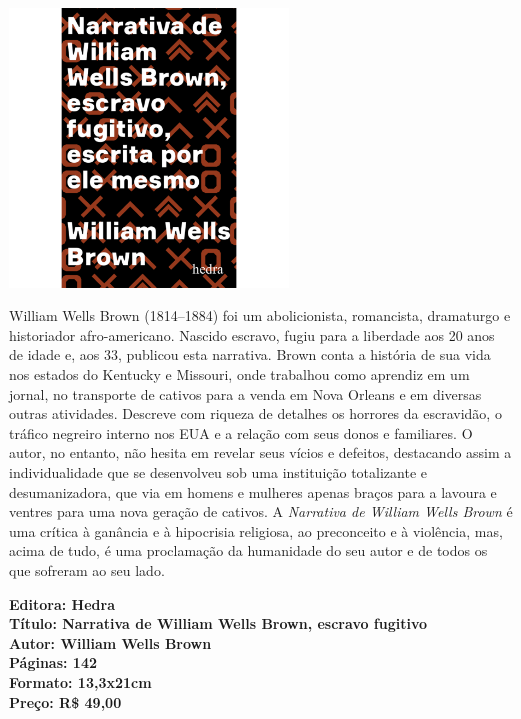 \pagebreak

\begin{center}
\hspace*{-3.6cm}
\hspace*{3.1cm}\includegraphics[width=74mm]{./grid/brown.png}
\end{center}

\hspace*{-7cm}\hrulefill\hspace*{-7cm}

\medskip

\noindent{}William Wells Brown (1814–1884) foi um abolicionista, romancista, dramaturgo e historiador afro-americano. Nascido escravo, fugiu para a liberdade aos 20 anos de idade e, aos 33, publicou esta narrativa. Brown conta a história de sua vida nos estados do Kentucky e Missouri, onde trabalhou como aprendiz em um jornal, no transporte de cativos para a venda em Nova Orleans e em diversas outras atividades. Descreve com riqueza de detalhes os horrores da escravidão, o tráfico negreiro interno nos EUA e a relação com seus donos e familiares.
O autor, no entanto, não hesita em revelar seus vícios e defeitos, destacando assim a individualidade que se desenvolveu sob uma instituição totalizante e desumanizadora, que via em homens e mulheres apenas braços para a lavoura e ventres para uma nova geração de cativos. A \textit{Narrativa de William Wells Brown} é uma crítica à ganância e à hipocrisia religiosa, ao preconceito e à violência, mas, acima de tudo, é uma proclamação da humanidade do seu autor e de todos os que sofreram ao seu lado.

\vfill

\noindent\begin{minipage}[c]{.5\linewidth}
{\small\textbf{
\hspace*{-.1cm}Editora: Hedra\\
Título: Narrativa de William Wells Brown, escravo fugitivo\\
Autor: William Wells Brown\\ 
Páginas: 142\\
Formato: 13,3x21cm\\
Preço: R\$ 49,00\\
}}
\end{minipage}

